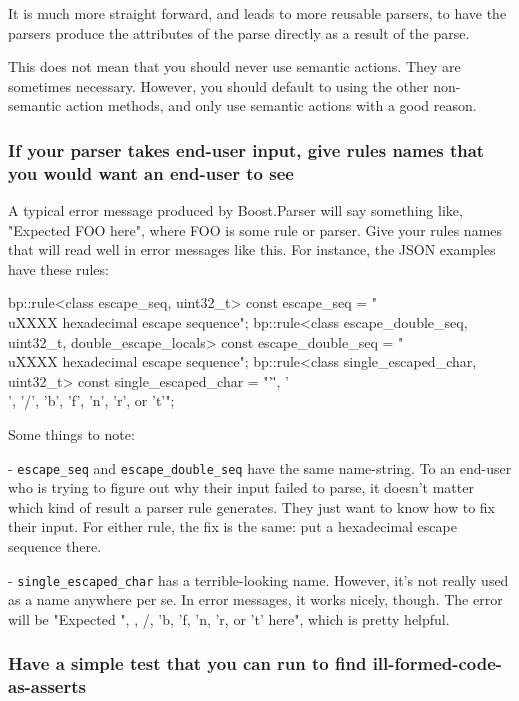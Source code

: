 It is much more straight forward, and leads to more reusable parsers, to have the parsers produce the attributes of the parse directly as a result of the parse.

This does not mean that you should never use semantic actions. They are sometimes necessary. However, you should default to using the other non-semantic action methods, and only use semantic actions with a good reason.

\subsubsection{If your parser takes end-user input, give rules names that you would want an end-user to see}

A typical error message produced by Boost.Parser will say something like, "Expected FOO here", where FOO is some rule or parser. Give your rules names that will read well in error messages like this. For instance, the JSON examples have these rules:

\begin{code}
bp::rule<class escape_seq, uint32_t> const escape_seq =
    "\\uXXXX hexadecimal escape sequence";
bp::rule<class escape_double_seq, uint32_t, double_escape_locals> const
    escape_double_seq = "\\uXXXX hexadecimal escape sequence";
bp::rule<class single_escaped_char, uint32_t> const single_escaped_char =
    "'\"', '\\', '/', 'b', 'f', 'n', 'r', or 't'";
\end{code}

Some things to note:

- \texttt{escape\_seq} and \texttt{escape\_double\_seq} have the same name-string. To an end-user who is trying to figure out why their input failed to parse, it doesn't matter which kind of result a parser rule generates. They just want to know how to fix their input. For either rule, the fix is the same: put a hexadecimal escape sequence there.

- \texttt{single\_escaped\_char} has a terrible-looking name. However, it's not really used as a name anywhere per se. In error messages, it works nicely, though. The error will be "Expected \textquotesingle"\textquotesingle, \textquotesingle\textquotesingle, \textquotesingle/\textquotesingle, 'b\textquotesingle, 'f\textquotesingle, 'n\textquotesingle, 'r\textquotesingle, or 't' here", which is pretty helpful.

\subsubsection{Have a simple test that you can run to find ill-formed-code-as-asserts}

